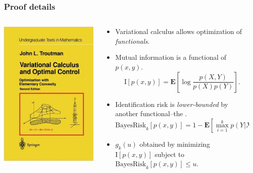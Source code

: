 \documentclass{beamer}
\newcommand{\E}{\textbf{E}}
\begin{document}
\begin{frame}[label=main]
\frametitle{Proof details}
\begin{columns}
\begin{column}{0.25\textwidth}
\includegraphics[scale = 0.27]{vcalc.jpg}
\end{column}
\begin{column}{0.75\textwidth}
\begin{itemize}
\item Variational calculus allows optimization of \emph{functionals}.\pause
\item Mutual information is a functional of $p(x, y)$. 
\[
\text{I}[p(x, y)] = \E\left[\log \frac{p(X, Y)}{p(X)p(Y)}\right].
\]
\pause
\item Identification risk is \emph{lower-bounded} by another functional--the \hyperlink{supplemental}{}. 
\[
\text{BayesRisk}_k[p(x, y)] = 1-\E[\max_{i=1}^k p(Y|X_i)].
\]

\pause
\item $g_k(u)$ obtained by minimizing $\text{I}[p(x, y)]$ subject to $\text{BayesRisk}_k[p(x,y)] \leq u$.
\end{itemize}
\end{column}
\end{columns}
\end{frame}
\end{document}
